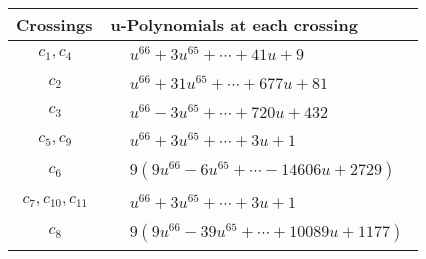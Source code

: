 \documentclass[1p]{elsarticle_modified}
\theoremstyle{definition}
\begin{document}
\begin{tabular}{m{50pt}|m{274pt}}
Crossings & \hspace{64pt}u-Polynomials at each crossing \\
\hline $$\begin{aligned}c_{1},c_{4}\end{aligned}$$&$\begin{aligned}
&u^{66}+3 u^{65}+\cdots+41 u+9
\end{aligned}$\\
\hline $$\begin{aligned}c_{2}\end{aligned}$$&$\begin{aligned}
&u^{66}+31 u^{65}+\cdots+677 u+81
\end{aligned}$\\
\hline $$\begin{aligned}c_{3}\end{aligned}$$&$\begin{aligned}
&u^{66}-3 u^{65}+\cdots+720 u+432
\end{aligned}$\\
\hline $$\begin{aligned}c_{5},c_{9}\end{aligned}$$&$\begin{aligned}
&u^{66}+3 u^{65}+\cdots+3 u+1
\end{aligned}$\\
\hline $$\begin{aligned}c_{6}\end{aligned}$$&$\begin{aligned}
&9(9 u^{66}-6 u^{65}+\cdots-14606 u+2729)
\end{aligned}$\\
\hline $$\begin{aligned}c_{7},c_{10},c_{11}\end{aligned}$$&$\begin{aligned}
&u^{66}+3 u^{65}+\cdots+3 u+1
\end{aligned}$\\
\hline $$\begin{aligned}c_{8}\end{aligned}$$&$\begin{aligned}
&9(9 u^{66}-39 u^{65}+\cdots+10089 u+1177)
\end{aligned}$\\
\hline
\end{tabular}\\~\\
\newpage\renewcommand{\arraystretch}{1}
\end{document}
